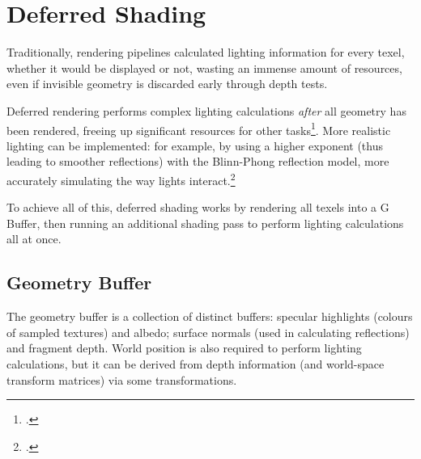 \documentclass[11pt, oneside]{report}
\begin{document}
\chapter{Deferred Shading}
Traditionally, rendering pipelines calculated lighting information for every \gls{texel}, whether it would be displayed or not, wasting an immense amount of resources, even if invisible geometry is discarded early through \glspl{depth test}.

Deferred rendering performs complex lighting calculations \textit{after} all geometry has been rendered, freeing up significant resources for other tasks\footcite{gpupro-deferred}. More realistic lighting can be implemented: for example, by using a higher exponent (thus leading to smoother reflections) with the \gls{Blinn-Phong reflection model}, more accurately simulating the way lights interact.\footcite{ferko-deferred}

To achieve all of this, deferred shading works by rendering all texels into a \gls{G Buffer}, then running an additional shading pass to perform lighting calculations all at once.

\section{Geometry Buffer}
The geometry buffer is a collection of distinct buffers: \gls{specular} highlights (colours of sampled textures) and albedo; surface normals (used in calculating reflections) and fragment depth. World position is also required to perform lighting calculations, but it can be derived from depth information (and world-space transform matrices) via some transformations.
\end{document}
